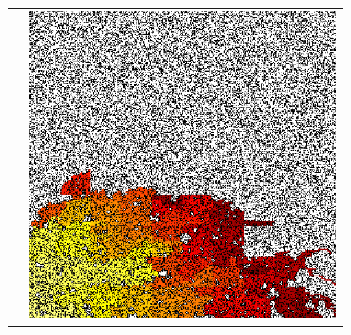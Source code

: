 \documentclass{article}
\begin{document}
\begin{center}
\begin{tabular}{cc}
&
\includegraphics[width=3.2in]{safepbnf-80min-2threads-100nblocks-unit-four-035-360-360}
\\
\end{tabular}
\end{center}
\end{document}
